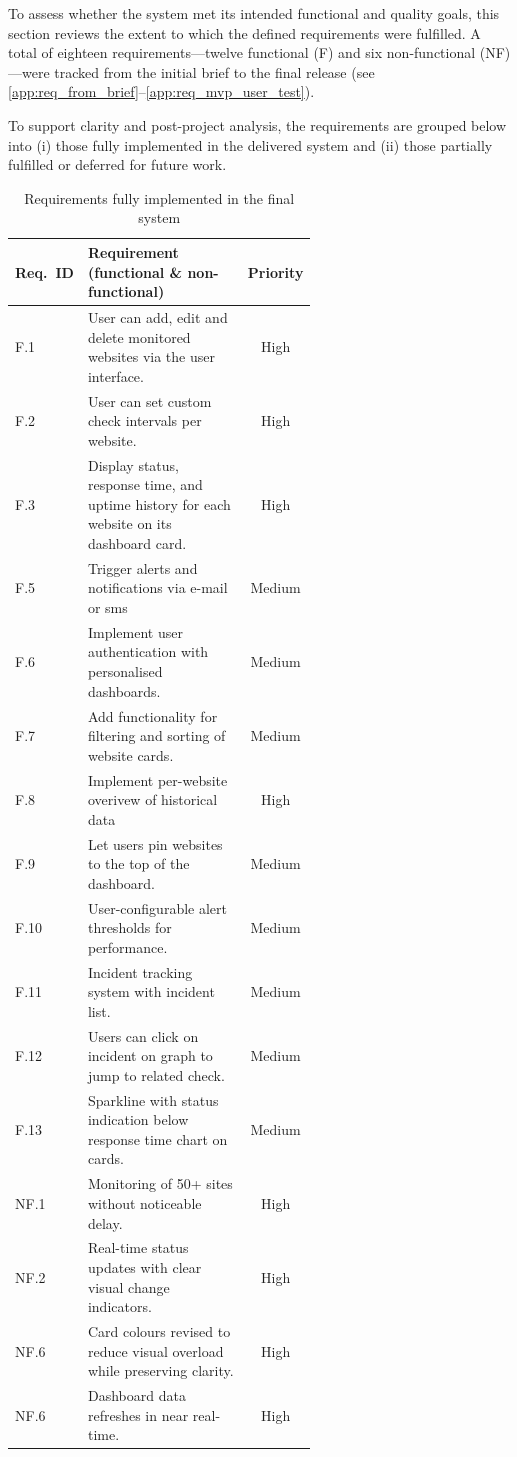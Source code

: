To assess whether the system met its intended functional and quality goals, this section reviews the extent to which the defined requirements were fulfilled. A total of eighteen requirements—twelve functional (F) and six non-functional (NF)—were tracked from the initial brief to the final release (see \autoref{app:req_from_brief}–\autoref{app:req_mvp_user_test}).

To support clarity and post-project analysis, the requirements are grouped below into (i) those fully implemented in the delivered system and (ii) those partially fulfilled or deferred for future work.

\begin{table}[H]
\centering
\begin{tabular}{|l|p{0.60\linewidth}|c|}
\hline
\textbf{Req.\ ID} & \textbf{Requirement (functional \& non-functional)} & \textbf{Priority}\\ \hline
F.1  & User can add, edit and delete monitored websites via the user interface.& High   \\ \hline
F.2  & User can set custom check intervals per website.& High   \\ \hline
F.3  & Display status, response time, and uptime history for each website on its dashboard card.& High   \\ \hline
F.5& Trigger alerts and notifications via e-mail or sms& Medium \\ \hline
F.6& Implement user authentication with personalised dashboards.& Medium \\ \hline

F.7  & Add functionality for filtering and sorting of website cards.& Medium \\ \hline
F.8  & Implement per-website overivew of historical data& High   \\ \hline
F.9  & Let users pin websites to the top of the dashboard.& Medium \\ \hline
F.10 & User-configurable alert thresholds for performance.                      & Medium \\ \hline
F.11 & Incident tracking system with incident list.                             & Medium \\ \hline
F.12 & Users can click on incident on graph to jump to related check.& Medium \\ \hline 
 F.13& Sparkline with status indication below response time chart on cards.&Medium \\\hline \hline
NF.1 & Monitoring of 50+ sites without noticeable delay.                        & High   \\ \hline
NF.2 & Real-time status updates with clear visual change indicators.            & High   \\ \hline
NF.6 & Card colours revised to reduce visual overload while preserving clarity. & High   \\ \hline
NF.6 & Dashboard data refreshes in near real-time.               & High   \\ \hline
\end{tabular}
\caption{Requirements fully implemented in the final system}
\label{tab:req_complete}
\end{table}

